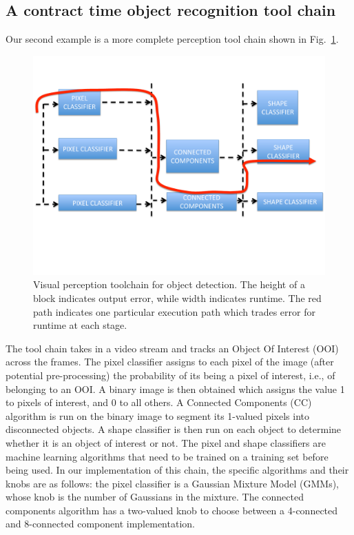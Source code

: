 

\subsection{A contract time object recognition tool chain}

Our second example is a more complete perception tool chain shown in Fig.~\ref{fig:chain}.
\begin{figure}[t]
	\centering
	\includegraphics[width=0.9\columnwidth]{figures/chain}
	\caption{Visual perception toolchain for object detection. The height of a block indicates output error, while width indicates runtime. The red path indicates one particular execution path which trades error for runtime at each stage.}
	\label{fig:chain}
\end{figure}
The tool chain takes in a video stream and tracks an Object Of Interest (OOI) across the frames.
The pixel classifier assigns to each pixel of the image (after potential pre-processing) the probability of its being a pixel of interest, i.e., of belonging to an OOI.
A binary image is then obtained which assigns the value 1 to pixels of interest, and 0 to all others.
A Connected Components (CC) algorithm is run on the binary image to segment its 1-valued pixels into disconnected objects.
A shape classifier is then run on each object to determine whether it is an object of interest or not.
The pixel and shape classifiers are machine learning algorithms that need to be trained on a training set before being used.
In our implementation of this chain, the specific algorithms and their knobs are as follows:
the pixel classifier is a Gaussian Mixture Model (GMMs), whose knob is the number of Gaussians in the mixture.
The connected components algorithm has a two-valued knob to choose between a 4-connected and 8-connected component implementation.

